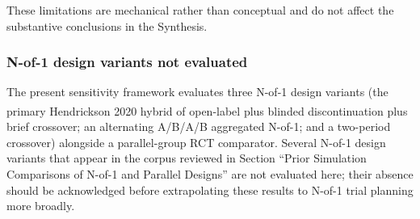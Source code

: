 \documentclass[
  11pt,
]{article}
\begin{document}
These limitations are mechanical rather than conceptual and do not
affect the substantive conclusions in the Synthesis.

\subsubsection{N-of-1 design variants not
evaluated}\label{n-of-1-design-variants-not-evaluated}

The present sensitivity framework evaluates three N-of-1 design variants
(the primary Hendrickson 2020
hybrid\textsuperscript{} of
open-label plus blinded discontinuation plus brief crossover; an
alternating A/B/A/B aggregated N-of-1; and a two-period crossover)
alongside a parallel-group RCT comparator. Several N-of-1 design
variants that appear in the corpus reviewed in Section ``Prior
Simulation Comparisons of N-of-1 and Parallel Designs'' are not
evaluated here; their absence should be acknowledged before
extrapolating these results to N-of-1 trial planning more broadly.
\end{document}
